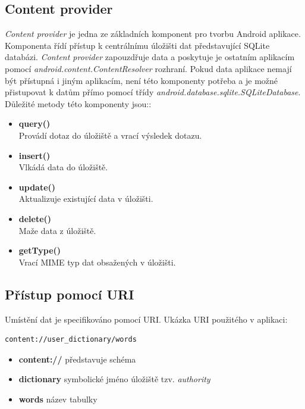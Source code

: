 \documentclass{diplomka}
\begin{document}
\subsection{Content provider}
\emph{Content provider} je jedna ze základních komponent pro tvorbu Android aplikace. Komponenta řídí přístup k centrálnímu úložišti dat představující SQLite databázi. \emph{Content provider} zapouzdřuje data a poskytuje je ostatním aplikacím pomocí \emph{android.content.ContentResolver} rozhraní. Pokud data aplikace nemají být přístupná i jiným aplikacím, není této komponenty potřeba a je možné přistupovat k datům přímo pomocí třídy \emph{android.database.sqlite.SQLiteDatabase}. Důležité metody této komponenty jsou::

\begin{itemize}[]
\item \textbf{query()}\\
Provádí dotaz do úložiště a vrací výsledek dotazu.
\item \textbf{insert()}\\
Vlkádá data do úložiště.
\item \textbf{update()}\\
Aktualizuje existující data v úložišti.
\item \textbf{delete()}\\
Maže data z úložiště.
\item \textbf{getType()}\\
Vrací MIME typ dat obsažených v úložišti.
\end{itemize}

\subsection*{Přístup pomocí URI}
Umístění dat je specifikováno pomocí URI. Ukázka URI použitého v aplikaci:
\begin{verbatim}
content://user_dictionary/words
\end{verbatim}
\begin{itemize}[noitemsep,nolistsep]
\item \textbf{content://} představuje schéma
\item \textbf{dictionary} symbolické jméno úložiště tzv. \emph{authority}
\item \textbf{words} název tabulky
\end{itemize}
\end{document}
